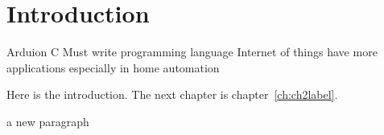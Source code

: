 \chapter{Introduction}\label{ch:introduction}
Arduion C 
Must write programming language
Internet of things have more applications especially in home automation



Here is the introduction. The next chapter is chapter~\ref{ch:ch2label}.


a new paragraph


